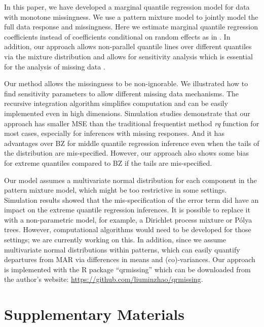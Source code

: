 \documentclass[useAMS,usenatbib,referee]{biom}
\newcommand{\polya}{P\'{o}lya} \newcommand{\yobs}{\bmath y_{\itl{obs}}}
\begin{document}
In this paper, we have developed a marginal quantile regression model
for data with monotone missingness. We use a pattern mixture model to
jointly model the full data response and missingness. Here we estimate
marginal quantile regression coefficients instead of coefficients
conditional on random effects as in \citet{yuan2010}. In addition, our
approach allows non-parallel quantile lines over different quantiles
via the mixture distribution and allows for sensitivity analysis which
is essential for the analysis of missing data \citep{nas2010}.

Our method allows the missingness to be non-ignorable.
We illustrated how to find sensitivity parameters to allow different missing data mechanisms. The
recursive integration algorithm simplifies computation and can be
easily implemented even in high dimensions. Simulation studies
demonstrate that our approach has smaller MSE than the traditional
frequentist method \textit{rq} function for most cases, especially for
inferences with missing responses. And it has advantages over
BZ for middle quantile regression inference even when
the tails of the distribution are mis-specified.  However, our approach also shows
some bias for extreme quantiles compared to BZ if the
tails are mis-specified.

Our model assumes a multivariate normal distribution for each
component in the pattern mixture model, which might be too restrictive
in some settings. Simulation results showed that the mis-specification
of the error term did have an impact on the extreme quantile
regression inferences.  It is possible to replace it with a
non-parametric model, for example, a Dirichlet process mixture or
\polya{} trees. However, computational algorithms would need to be
developed for those settings;  we are currently working on this. In addition, since we assume
multivariate normal distributions within patterns, which can easily
quantify departures from MAR via differences in means and
(co)-variances.
Our approach is implemented with the R package ``qrmissing'' which can be downloaded from the author's website: \url{https://github.com/liuminzhao/qrmissing}.

\backmatter

\section*{Supplementary Materials}
\end{document}
